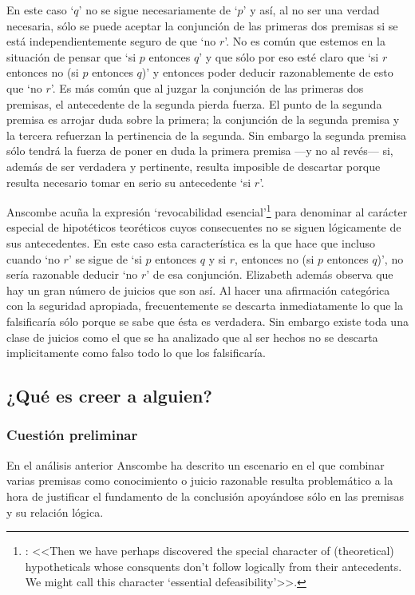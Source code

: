   En este caso `$q$' no se sigue necesariamente de `$p$' y así, al no ser una
  verdad necesaria, sólo se puede aceptar la conjunción de las primeras dos
  premisas si se está independientemente seguro de que `no $r$'. No es común que
  estemos en la situación de pensar que `si $p$ entonces $q$' y que sólo por eso
  esté claro que `si $r$ entonces no (si $p$ entonces $q$)' y entonces poder
  deducir razonablemente de esto que `no $r$'. Es más común que al juzgar la
  conjunción de las primeras dos premisas, el antecedente de la segunda pierda
  fuerza. El punto de la segunda premisa es arrojar duda sobre la primera; la
  conjunción de la segunda premisa y la tercera refuerzan la pertinencia de la
  segunda. Sin embargo la segunda premisa sólo tendrá la fuerza de poner en duda
  la primera premisa ---y no al revés--- si, además de ser verdadera y
  pertinente, resulta imposible de descartar porque resulta necesario tomar en
  serio su antecedente `si $r$'\autocite[Cf.~][301]{anscombe2015logic:qpa}.

  Anscombe acuña la expresión `revocabilidad
  esencial'\footnote{\cite[Cf.~][301]{anscombe2015logic:qpa}: <<Then we have
    perhaps discovered the special character of (theoretical) hypotheticals
    whose consquents don't follow logically from their antecedents. We might
    call this character `essential defeasibility'>>.} para denominar al carácter
  especial de hipotéticos teoréticos cuyos consecuentes no se siguen lógicamente
  de sus antecedentes. En este caso esta característica es la que hace que
  incluso cuando `no $r$' se sigue de `si $p$ entonces $q$ y si $r$, entonces no
  (si $p$ entonces $q$)', no sería razonable deducir `no $r$' de esa conjunción.
  Elizabeth además observa que hay un gran número de juicios que son así. Al
  hacer una afirmación categórica con la seguridad apropiada, frecuentemente se
  descarta inmediatamente lo que la falsificaría sólo porque se sabe que ésta es
  verdadera. Sin embargo existe toda una clase de juicios como el que se ha
  analizado que al ser hechos no se descarta implicitamente como falso todo lo
  que los falsificaría\autocite[Cf.~][302]{anscombe2015logic:qpa}.

\subsection{¿Qué es creer a alguien?}
\subsubsection{Cuestión preliminar}
En el análisis anterior Anscombe ha descrito un escenario en el que combinar
varias premisas como conocimiento o juicio razonable resulta problemático a la
hora de justificar el fundamento de la conclusión apoyándose sólo en las
premisas y su relación lógica.

